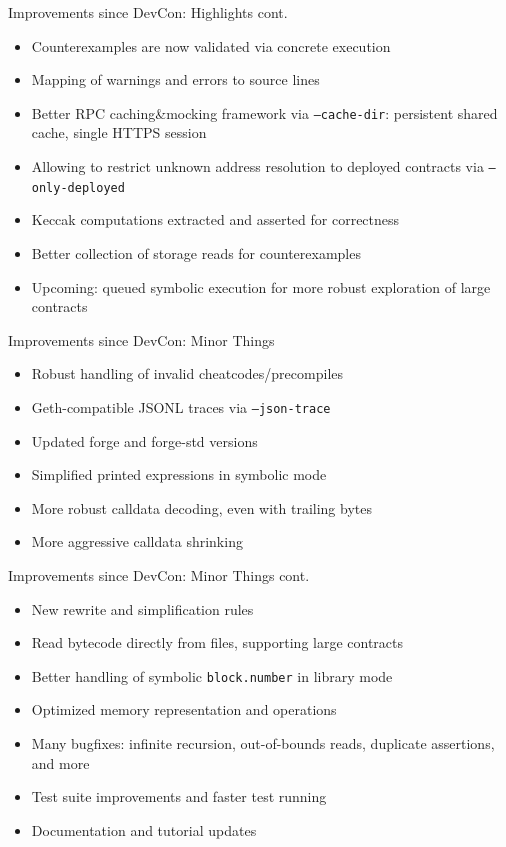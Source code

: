 \documentclass[aspectratio=169]{beamer}
\begin{document}
\begin{frame}{Improvements since DevCon: Highlights cont.}
\begin{itemize}
    \item Counterexamples are now validated via concrete execution
    \item Mapping of warnings and errors to source lines
    \item Better RPC caching\&mocking framework via \texttt{--cache-dir}:
      persistent shared cache, single HTTPS session
    \item Allowing to restrict unknown address resolution to deployed contracts
        via \texttt{--only-deployed}
    \item Keccak computations extracted and asserted for correctness
    \item Better collection of storage reads for counterexamples
    \item Upcoming: queued symbolic execution for more robust exploration of
        large contracts
\end{itemize}
\end{frame}

\begin{frame}{Improvements since DevCon: Minor Things}
\begin{itemize}
    \item Robust handling of invalid cheatcodes/precompiles
    \item Geth-compatible JSONL traces via \texttt{--json-trace}
    \item Updated forge and forge-std versions
    \item Simplified printed expressions in symbolic mode
    \item More robust calldata decoding, even with trailing bytes
    \item More aggressive calldata shrinking
\end{itemize}
\end{frame}

\begin{frame}{Improvements since DevCon: Minor Things cont.}
\begin{itemize}
    \item New rewrite and simplification rules
    \item Read bytecode directly from files, supporting large contracts
    \item Better handling of symbolic \texttt{block.number} in library mode
    \item Optimized memory representation and operations
    \item Many bugfixes: infinite recursion, out-of-bounds reads, duplicate
        assertions, and more
    \item Test suite improvements and faster test running
    \item Documentation and tutorial updates
\end{itemize}
\end{frame}
\end{document}
